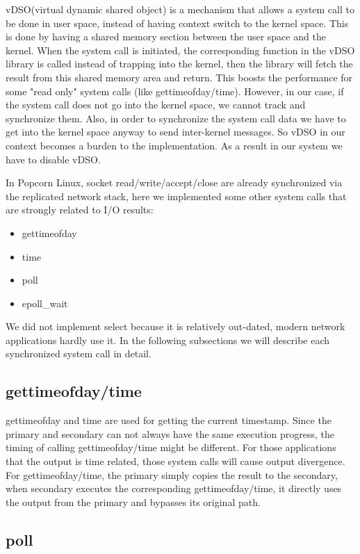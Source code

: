 vDSO(virtual dynamic shared object) is a mechanism that allows a system call to be done in user space, instead of having context switch to the kernel space. This is done by having a shared memory section between the user space and the kernel. When the system call is initiated, the corresponding function in the vDSO library is called instead of trapping into the kernel, then the library will fetch the result from this shared memory area and return. This boosts the performance for some "read only" system calls (like gettimeofday/time). However, in our case, if the system call does not go into the kernel space, we cannot track and synchronize them. Also, in order to synchronize the system call data we have to get into the kernel space anyway to send inter-kernel messages. So vDSO in our context becomes a burden to the implementation. As a result in our system we have to disable vDSO.

In Popcorn Linux, socket read/write/accept/close are already synchronized via the replicated network stack, here we implemented some other system calls that are strongly related to I/O results: 
\begin{itemize}
\item gettimeofday
\item time
\item poll
\item epoll\_wait
\end{itemize}

We did not implement select because it is relatively out-dated, modern network applications hardly use it. In the following subsections we will describe each synchronized system call in detail.

\subsection{gettimeofday/time}

gettimeofday and time are used for getting the current timestamp. Since the primary and secondary can not always have the same execution progress, the timing of calling gettimeofday/time might be different. For those applications that the output is time related, those system calls will cause output divergence. For gettimeofday/time, the primary simply copies the result to the secondary, when secondary executes the corresponding gettimeofday/time, it directly uses the output from the primary and bypasses its original path.

\subsection{poll}


